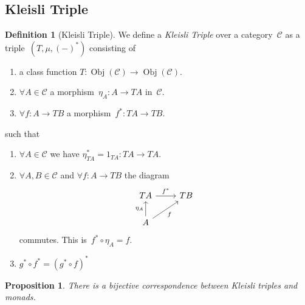 \documentclass[a4paper]{article}
\theoremstyle{plain}
\newtheorem{proposition}[theorem]{Proposition}
\theoremstyle{definition}
\newtheorem{definition}[theorem]{Definition}
\DeclareMathOperator{\Obj}{Obj}
\newcommand{\cat}[1]{\mathcal{#1}}
\begin{document}
\subsection{Kleisli Triple}
\begin{definition}[Kleisli Triple]
    We define a \emph{Kleisli Triple} over a category~\(\cat{C}\)
    as a triple~\((T, \mu, (-)^{\ast})\) consisting of
    \begin{enumerate}
        \item a class function
            \(T\colon\Obj(\cat{C})\longrightarrow\Obj(\cat{C})\).
        \item \(\forall A\in\cat{C}\)
            a morphism~\(\eta_{A}\colon A\longrightarrow TA\)
            in~\(\cat{C}\).
        \item \(\forall f\colon A\longrightarrow TB\)
            a morphism~\(f^{\ast}\colon TA\longrightarrow TB\).
    \end{enumerate}
    such that
    \begin{enumerate}
        \item \(\forall A\in\cat{C}\) we have
            \(\eta^{\ast}_{TA} = 1_{TA}\colon TA\longrightarrow TA\).
        \item \(\forall A,B\in\cat{C}\)
            and \(\forall f\colon A\longrightarrow TB\)
            the diagram
            \[\begin{tikzcd}
                TA \arrow[r, "f^{\ast}"] & TB \\
                A \arrow[u, "\eta_{A}"] \arrow[ur, "f", swap] &
            \end{tikzcd}\]
            commutes. This is~\(f^{\ast}\circ\eta_{A} = f\).
        \item \(g^{\ast}\circ f^{\ast} = (g^{\ast}\circ f)^{\ast}\)
    \end{enumerate}
\end{definition}

\begin{proposition}
    There is a bijective correspondence between Kleisli triples and monads.
\end{proposition}
\end{document}
